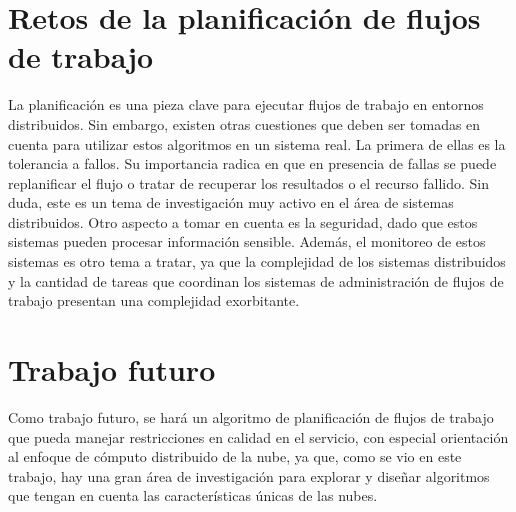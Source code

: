 \section{Retos de la planificación de flujos de trabajo}
La planificación es una pieza clave para ejecutar flujos de trabajo en entornos distribuidos. Sin embargo, existen otras cuestiones que deben ser tomadas en cuenta para utilizar estos algoritmos en un sistema real. La primera de ellas es la tolerancia a fallos. Su importancia radica en que en presencia de fallas se puede replanificar el flujo o tratar de recuperar los resultados o el recurso fallido. Sin duda, este es un tema de investigación muy activo en el área de sistemas distribuidos. Otro aspecto a tomar en cuenta es la seguridad, dado que estos sistemas pueden procesar información sensible. Además, el monitoreo de estos sistemas es otro tema a tratar, ya que la complejidad de los sistemas distribuidos y la cantidad de tareas que coordinan los sistemas de administración de flujos de trabajo presentan una complejidad exorbitante.

\section{Trabajo futuro}
Como trabajo futuro, se hará un algoritmo de planificación de flujos de trabajo que pueda manejar restricciones en calidad en el servicio, con especial orientación al enfoque de cómputo distribuido de la nube, ya que, como se vio en este trabajo, hay una gran área de investigación para explorar y diseñar algoritmos que tengan en cuenta las características únicas de las nubes.